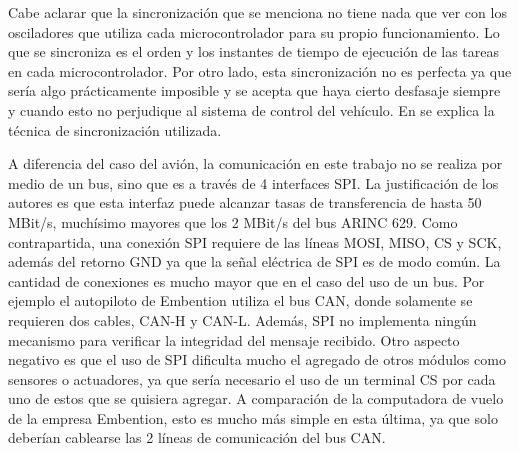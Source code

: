 
Cabe aclarar que la sincronización que se menciona no tiene nada que ver con los osciladores que utiliza cada microcontrolador para su propio funcionamiento. Lo que se sincroniza es el orden y los instantes de tiempo de ejecución de las tareas en cada microcontrolador. Por otro lado, esta sincronización no es perfecta ya que sería algo prácticamente imposible y se acepta que haya cierto desfasaje siempre y cuando esto no perjudique al sistema de control del vehículo. En \cite{hiergeist2018implementation} se explica la técnica de sincronización utilizada.

A diferencia del caso del avión, la comunicación en este trabajo no se realiza por medio de un bus, sino que es a través de 4 interfaces SPI. La justificación de los autores es que esta interfaz puede alcanzar tasas de transferencia de hasta 50 MBit/s, muchísimo mayores que los 2 MBit/s del bus ARINC 629. Como contrapartida, una conexión SPI requiere de las líneas MOSI, MISO, CS y SCK, además del retorno GND ya que la señal eléctrica de SPI es de modo común. La cantidad de conexiones es mucho mayor que en el caso del uso de un bus. Por ejemplo el autopiloto de Embention utiliza el bus CAN, donde solamente se requieren dos cables, CAN-H y CAN-L. Además, SPI no implementa ningún mecanismo para verificar la integridad del mensaje recibido. Otro aspecto negativo es que el uso de SPI dificulta mucho el agregado de otros módulos como sensores o actuadores, ya que sería necesario el uso de un terminal CS por cada uno de estos que se quisiera agregar. A comparación de la computadora de vuelo de la empresa Embention, esto es mucho más simple en esta última, ya que solo deberían cablearse las 2 líneas de comunicación del bus CAN.






